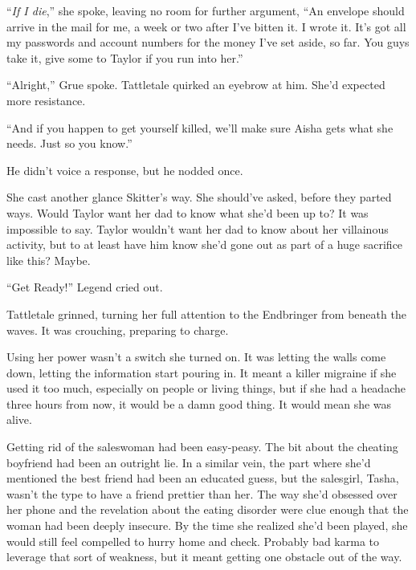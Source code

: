``\emph{If I die},'' she spoke, leaving no room for further argument, ``An envelope should arrive in the mail for me, a week or two after I've bitten it.  I wrote it.  It's got all my passwords and account numbers for the money I've set aside, so far.  You guys take it, give some to Taylor if you run into her.''



``Alright,'' Grue spoke.  Tattletale quirked an eyebrow at him.  She'd expected more resistance.



``And if you happen to get yourself killed, we'll make sure Aisha gets what she needs.  Just so you know.''



He didn't voice a response, but he nodded once.



She cast another glance Skitter's way.  She should've asked, before they parted ways.  Would Taylor want her dad to know what she'd been up to?  It was impossible to say.  Taylor wouldn't want her dad to know about her villainous activity, but to at least have him know she'd gone out as part of a huge sacrifice like this?  Maybe.



``Get Ready!'' Legend cried out.



Tattletale grinned, turning her full attention to the Endbringer from beneath the waves.  It was crouching, preparing to charge.



Using her power wasn't a switch she turned on.  It was letting the walls come down, letting the information start pouring in.  It meant a killer migraine if she used it too much, especially on people or living things, but if she had a headache three hours from now, it would be a damn good thing.  It would mean she was alive.



\blacksquare



Getting rid of the saleswoman had been easy-peasy.  The bit about the cheating boyfriend had been an outright lie.  In a similar vein, the part where she'd mentioned the best friend had been an educated guess, but the salesgirl, Tasha, wasn't the type to have a friend prettier than her.   The way she'd obsessed over her phone and the revelation about the eating disorder were clue enough that the woman had been deeply insecure.  By the time she realized she'd been played, she would still feel compelled to hurry home and check.  Probably bad karma to leverage that sort of weakness, but it meant getting one obstacle out of the way.



